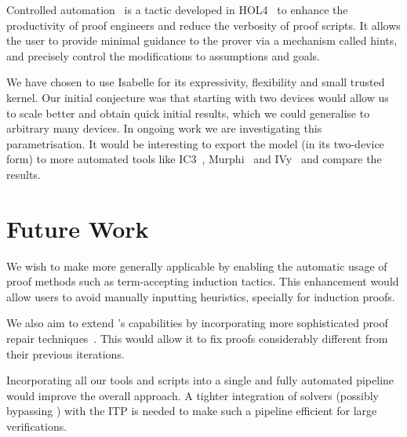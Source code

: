 \documentclass[10pt,conference]{IEEEtran}
\begin{document}
Controlled automation~\cite{ControlledAutomation} is a tactic developed in HOL4~\cite{HOL4} to enhance the productivity of proof engineers and reduce the verbosity of proof scripts. It allows the user to provide minimal guidance to the prover via a mechanism called hints, and precisely control the modifications to assumptions and goals.



 We have chosen to use Isabelle for its expressivity, flexibility and small trusted kernel. Our initial conjecture was that starting with two devices would allow us to scale better and obtain quick initial results, which we could generalise to arbitrary many devices. In ongoing work we are investigating this parametrisation. It would be interesting to export the model (in its two-device form) to more automated tools like IC3~\cite{IC3}, Murphi~\cite{Murphi} and IVy~\cite{IVy} and compare the results.


\section{Future Work}


We wish to make \supersketch{} more generally applicable by enabling the automatic usage of proof methods such as term-accepting induction tactics. This enhancement would allow users to avoid manually inputting heuristics, specially for induction proofs.  

We also aim to extend \superfix{}'s capabilities by incorporating more sophisticated proof repair techniques~\cite{coqpumpkin}. This would allow it to fix proofs considerably different from their previous iterations.

Incorporating all our tools and scripts into a single and fully automated pipeline would improve the overall approach. %
A tighter integration of solvers (possibly bypassing \sledgehammer{}) with the ITP is needed to make such a pipeline efficient for large verifications.
\end{document}
